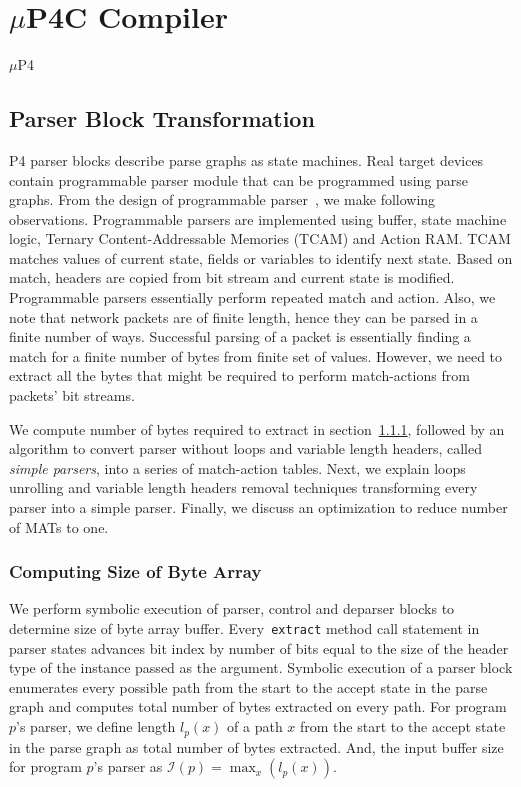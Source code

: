 \section{$\mu$P4C Compiler}
\label{section-mp4c-compiler}
$\mu$P4 


\subsection{Parser Block Transformation}
\label{subsection:parser-block-transformation}
P4 parser blocks describe parse graphs as state machines.
Real target devices contain programmable parser module that can be programmed using parse graphs.
From the design of programmable parser~\cite{6665172}, we make following observations.
Programmable parsers are implemented using buffer, state machine logic, Ternary Content-Addressable Memories (TCAM) and Action RAM. 
TCAM matches values of current state, fields or variables to identify next state. 
Based on match, headers are copied from bit stream and current state is modified.
Programmable parsers essentially perform repeated match and action.
Also, we note that network packets are of finite length, hence they can be parsed in a finite number of ways.
Successful parsing of a packet is essentially finding a match for a finite number of bytes from finite set of values.
However, we need to extract all the bytes that might be required to perform match-actions from packets' bit streams.

We compute number of bytes required to extract in section~\ref{subsubsection:computing-size-of-byte-array}, followed by an algorithm to convert parser without loops and variable length headers, called \textit{simple parsers}, into a series of match-action tables.
Next, we explain loops unrolling and variable length headers removal techniques transforming every parser into a simple parser.
Finally, we discuss an optimization to reduce number of MATs to one.


\subsubsection{Computing Size of Byte Array}
\label{subsubsection:computing-size-of-byte-array}
We perform symbolic execution of parser, control and deparser blocks to determine size of byte array buffer.
Every~\texttt{extract} method call statement in parser states advances bit index by number of bits equal to the size of the header type of the instance passed as the argument.
Symbolic execution of a parser block enumerates every possible path from the start to the accept state in the parse graph and computes total number of bytes extracted on every path.
For program $p$'s parser, we define length $l_{p}(x)$ of a path $x$ from the start to the accept state in the parse graph as total number of bytes extracted.
And, the input buffer size for program $p$'s parser as $\mathcal{I}(p) = \max_{x}(l_{p}(x))$. 


